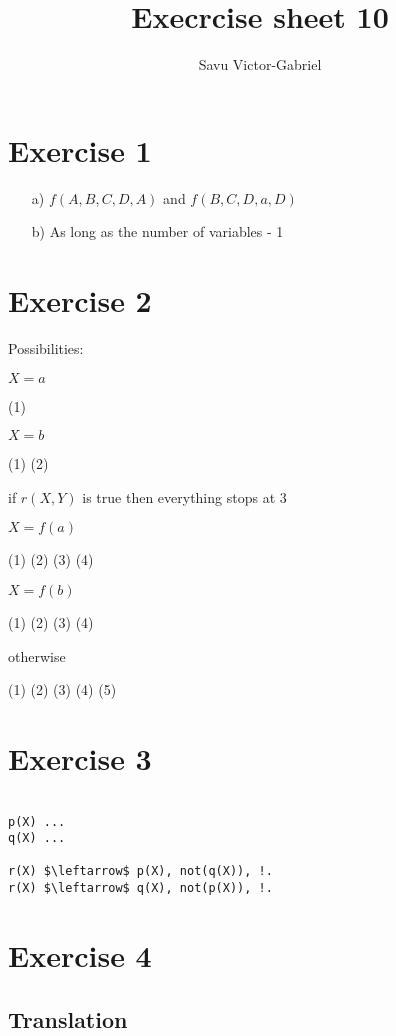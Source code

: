 \documentclass[10pt,a4paper]{article}
\title{Execrcise sheet 10}
\author{Savu Victor-Gabriel}
\begin{document}
	\maketitle
	
	\section{Exercise 1}
	
	\begin{itemize}
		\item[a)] $f(A, B, C, D, A)$ and $f(B, C, D, a, D)$
		\item[b)] As long as the number of variables - 1
	\end{itemize}
	
	\section{Exercise 2}
	
	Possibilities:
	
	$X = a$
	
	(1)
	
	$X = b$
	
	(1) (2)
	
	if $r(X, Y)$ is true then everything stops at 3
	
	$X = f(a)$
	
	(1) (2) (3) (4)
	
	$X = f(b)$
	
	(1) (2) (3) (4)
	
	otherwise
	
	(1) (2) (3) (4) (5)
	
	\section{Exercise 3}
	
	\begin{lstlisting}[mathescape]

p(X) ...
q(X) ...

r(X) $\leftarrow$ p(X), not(q(X)), !.
r(X) $\leftarrow$ q(X), not(p(X)), !.

	\end{lstlisting}
	
	\section{Exercise 4}
	
	\subsection{Translation}
	
\end{document}
